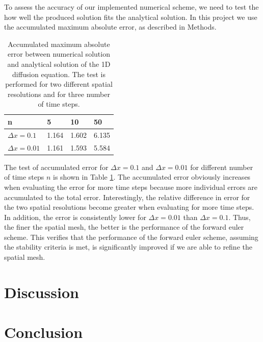 \documentclass[12pt]{extarticle}
\begin{document}
To assess the accuracy of our implemented numerical scheme, we need to test the how well the produced solution fits the analytical solution. In this project we use the accumulated maximum absolute error, as described in Methods.

\begin{table}[]
	\centering
	\begin{tabular}{|l|l|l|l|}
		\hline
		\textbf{n}      & \textbf{5} & \textbf{10} & \textbf{50} \\ \hline
		$\Delta x=0.1$  & 1.164      & 1.602       & 6.135       \\ \hline
		$\Delta x=0.01$ & 1.161      & 1.593       & 5.584       \\ \hline
	\end{tabular}
\caption{Accumulated maximum absolute error between numerical solution and analytical solution of the 1D diffusion equation. The test is performed for two different spatial resolutions and for three number of time steps.}
\label{tab:errors}
\end{table}

The test of accumulated error for $\Delta x=0.1$ and $\Delta x=0.01$ for different number of time steps $n$ is shown in Table \ref{tab:errors}. The accumulated error obviously increases when evaluating the error for more time steps because more individual errors are accumulated to the total error. Interestingly, the relative difference in error for the two spatial resolutions become greater when evaluating for more time steps. In addition, the error is consistently lower for $\Delta x=0.01$ than $\Delta x=0.1$. Thus, the finer the spatial mesh, the better is the performance of the forward euler scheme. This verifies that the performance of the forward euler scheme, assuming the stability criteria is met, is significantly improved if we are able to refine the spatial mesh.  


\section{Discussion}
\section{Conclusion}



\end{document}
